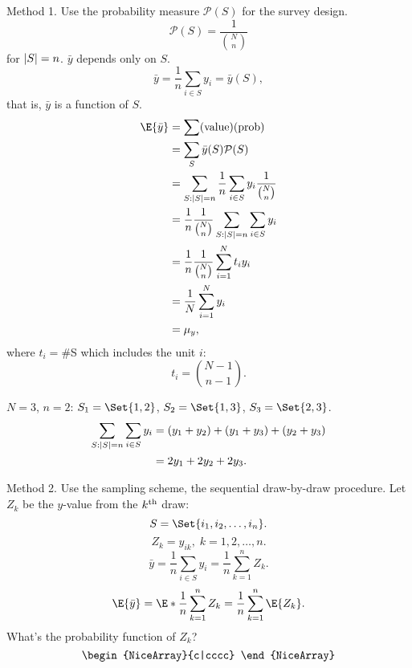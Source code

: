 \documentclass[oneside]{book}\usepackage[]{graphicx}\usepackage[svgnames]{xcolor}
\DeclarePairedDelimiter\abs{\lvert}{\rvert}
\begin{document}
\begin{enumerate}[(a)]
            Method 1. Use the probability measure $ \mathcal{P}(S) $
            for the survey design.
            \[ \mathcal{P}(S)=\frac{1}{\binom{N}{n}} \]
            for $ \abs{S}=n $. $ \bar{y} $ depends only on $ S $.
            \[ \bar{y}=\frac{1}{n}\sum_{i\in S}y_i=\bar{y}(S), \]
            that is, $ \bar{y} $ is a function of $ S $.
            \begin{align*}
                  \E{\bar{y}}
                   & =\sum(\text{value})(\text{prob})                                      \\
                   & =\sum_S \bar{y}(S)\mathcal{P}(S)                                      \\
                   & =\sum_{S:\abs{S}=n}\frac{1}{n}\sum_{i\in S}y_i \frac{1}{\binom{N}{n}} \\
                   & =\frac{1}{n}\frac{1}{\binom{N}{n}}\sum_{S:\abs{S}=n} \sum_{i\in S}y_i \\
                   & =\frac{1}{n}\frac{1}{\binom{N}{n}}\sum_{i=1}^{N}t_i y_i               \\
                   & =\frac{1}{N}\sum_{i=1}^{N}y_i                                         \\
                   & =\mu_y,
            \end{align*}
            where $ t_i = $\#S which includes the unit $ i $:
            \[ t_i=\binom{N-1}{n-1}. \]
            \begin{Example}{}
                  $ N=3 $, $ n=2 $: $ S_1=\Set{1,2} $, $ S_2=\Set{1,3} $, $ S_3=\Set{2,3} $.
                  \begin{align*}
                        \sum_{S:\abs{S}=n} \sum_{i\in S}y_i
                         & =(y_1+y_2)+(y_1+y_3)+(y_2+y_3) \\
                         & =2 y_1+2y_2+2y_3.
                  \end{align*}
            \end{Example}
            Method 2. Use the sampling scheme, the sequential
            draw-by-draw procedure. Let $ Z_k $ be the $ y $-value from the
            $ k\textsuperscript{th} $ draw:
            \[ S=\Set{i_1,i_2,\ldots,i_n}. \]
            \[ Z_k=y_{ik},\;k=1,2,\ldots,n. \]
            \[ \bar{y}=\frac{1}{n}\sum_{i\in S}y_i=\frac{1}{n}\sum_{k=1}^{n}Z_k. \]
            \[ \E{\bar{y}}=\E*{\frac{1}{n}\sum_{k=1}^n Z_k}
                  =\frac{1}{n}\sum_{k=1}^{n}\E{Z_k}. \]
            What's the probability function of $ Z_k $?
            \[ \begin{NiceArray}{c|cccc}

\end{NiceArray}\]
\end{enumerate}
\end{document}
